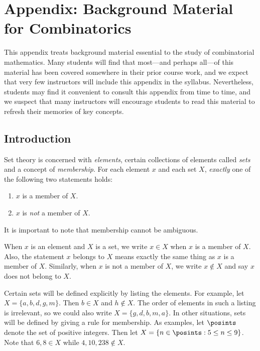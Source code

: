 
\chapter{Appendix: Background Material for Combinatorics}\label{app:background}

This appendix treats background material essential to the
study of combinatorial mathematics.  Many students will find that
most---and perhaps all---of this material has been covered somewhere
in their prior course work, and we expect that very few instructors
will include this appendix in the syllabus.  Nevertheless, students
may find it convenient to consult this appendix from time to
time, and we suspect that many instructors will encourage
students to read this material to refresh their memories of key
concepts.  

\section{Introduction}

Set theory is concerned with \textit{elements}, certain collections
of elements called \textit{sets} and a concept of \textit{membership}.
For each element $x$ and each set $X$, \textit{exactly} one of the 
following two statements holds:

\begin{enumerate}
\item $x$ is a member of $X$. 
\item $x$ is \textit{not} a member of $X$. 
\end{enumerate}

It is important to note that membership cannot be ambiguous.

When $x$ is an element and $X$ is a set, we write $x\in X$ when
$x$ is a member of $X$.  Also, the statement $x$ belongs to $X$ means
exactly the same thing as $x$ is a member of $X$.  Similarly, when
$x$ is not a member of $X$, we write $x\notin X$ and say $x$ does
not belong to $X$.

Certain sets will be defined explicitly by listing the elements.
For example, let $X=\{a,b,d,g,m\}$.  Then $b\in X$ and $h\notin X$.
The order of elements in such a listing is irrelevant, so we could
also write $X=\{g,d,b,m,a\}$.  In other situations, sets will be 
defined by giving a rule for membership.
As examples, let $\posints$ denote the set of positive integers.  
Then let $X=\{n\in\posints:5\le n\le 9\}$.   Note that $6,8\in X$ while
$4,10,238\notin X$.

